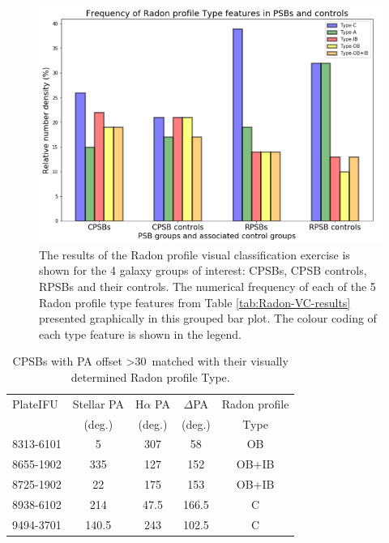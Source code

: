 \begin{figure}
    \centering
    \includegraphics[width=\columnwidth]{images/JupyterPlots/Radon-profile-types-grouped.png}
    \caption{The results of the Radon profile visual classification exercise is shown for the 4 galaxy groups of interest: CPSBs, CPSB controls, RPSBs and their controls. The numerical frequency of each of the 5 Radon profile type features from Table \ref{tab:Radon-VC-results} presented graphically in this grouped bar plot. The colour coding of each type feature is shown in the legend.}
    \label{fig:Radon-grouped-barchart}
\end{figure}

\begin{table}
\centering
\caption{CPSBs with PA offset \textgreater 30\textdegree\ matched with their visually determined Radon profile Type.}
\label{tab:offsetCPSBs-Radon-Type}
\begin{tabular}{lcccc}
\hline
PlateIFU  & Stellar PA & H$\alpha$ PA & $\Delta$PA & Radon profile\\
  & (deg.) & (deg.) & (deg.) & Type \\
\hline
8313-6101 & 5 & 307 & 58 & OB \\
8655-1902 & 335 & 127 & 152 & OB+IB \\
8725-1902 & 22 & 175 & 153 & OB+IB \\
8938-6102 & 214 & 47.5 & 166.5 & C \\
9494-3701 & 140.5 & 243 & 102.5 & C \\
\hline
\end{tabular}
\end{table}

